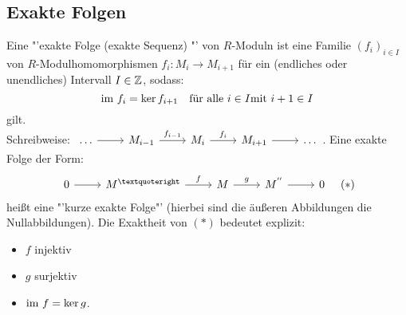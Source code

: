 \subsection{Exakte Folgen}
\begin{df}
	Eine "’exakte Folge (exakte Sequenz) "’ von $R$-Moduln ist eine Familie $(f_i)_{i \in I}$ von $R$-Modulhomomorphismen $f_i: M_i \to M_{i+1} $ für ein (endliches oder unendliches) Intervall $I \in \mathbb{Z} $, sodass: $$ \operatorname{\text{im}\,} f_i = \ker f_{i+1} \quad \text{für alle } i \in I \text{mit} \ i+1 \in I $$ gilt. \\
	Schreibweise: \quad  $\begin{tikzcd}
	\ldots \arrow{r}{}& M_{i-1} \arrow{r}{f_{i-1}}& M_i \arrow{r}{f_i} & M_{i+1} \arrow{r} & \ldots
	\end{tikzcd}$.	Eine exakte Folge der Form: $$\begin{tikzcd}
	0  \arrow{r} & M^{’} \arrow{r}{f} & M \arrow{r}{g} & M^{''} \arrow{r} & 0
	\end{tikzcd}  \quad (\ast) $$
	heißt eine "'kurze exakte Folge"' (hierbei sind die äußeren Abbildungen die Nullabbildungen). Die Exaktheit von $ (\ast)$ bedeutet explizit:
	\begin{itemize}
		\item $f$ injektiv
		\item $g$ surjektiv
		\item $\operatorname{\text{im}\,} f = \ker g $.
	\end{itemize}
\end{df}
